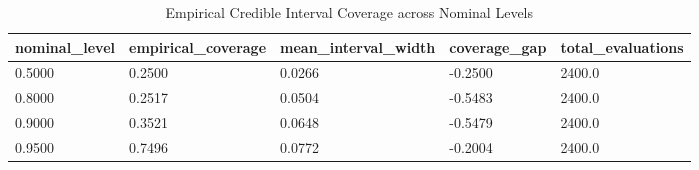\begin{table}[htbp]
\centering
\caption{Empirical Credible Interval Coverage across Nominal Levels}
\label{tab:table_T6_posterior_coverage}
\begin{tabular}{lllll}
\hline
nominal\_level & empirical\_coverage & mean\_interval\_width & coverage\_gap & total\_evaluations \\
\hline
0.5000 & 0.2500 & 0.0266 & -0.2500 & 2400.0 \\
0.8000 & 0.2517 & 0.0504 & -0.5483 & 2400.0 \\
0.9000 & 0.3521 & 0.0648 & -0.5479 & 2400.0 \\
0.9500 & 0.7496 & 0.0772 & -0.2004 & 2400.0 \\
\hline
\end{tabular}
\end{table}
